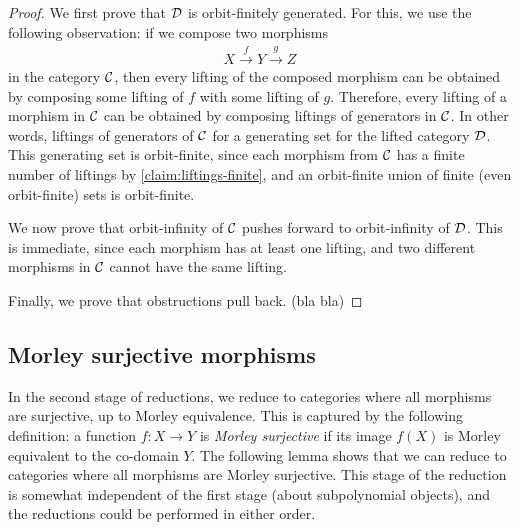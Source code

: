 \begin{proof}
We first prove that ${\mathcal D}$ is orbit-finitely generated. For this, we use the following observation: if we compose two morphisms 
\begin{align*}
X \stackrel{f} \to Y \stackrel{g} \to Z
\end{align*}
in the category ${\mathcal C}$, 
then every lifting of the composed morphism can be obtained by composing some lifting of $f$ with some lifting of $g$. Therefore, every lifting of a morphism in ${\mathcal C}$ can be obtained by composing liftings of generators in ${\mathcal C}$.  In other words, liftings of generators of ${\mathcal C}$ for a generating set for the lifted category ${\mathcal D}$. This generating set is orbit-finite, since each morphism from ${\mathcal C}$ has a finite number of liftings by  \cref{claim:liftings-finite}, and an  orbit-finite union of finite (even orbit-finite) sets is orbit-finite.

We now prove that orbit-infinity of ${\mathcal C}$ pushes forward to orbit-infinity of ${\mathcal D}$. This is immediate, since each morphism has at least one lifting, and two different morphisms in ${\mathcal C}$ cannot have the same lifting. 

Finally, we prove that obstructions pull back. (bla bla)
\end{proof}



\subsection{Morley surjective morphisms}
\label{sec:almost-surjective-morphisms}
In the second stage of reductions, we reduce to categories where all morphisms are surjective, up to Morley equivalence. This is captured by the following definition:  a function $f : X \to Y$ is \emph{Morley surjective} if its image $f(X)$ is Morley equivalent to the co-domain $Y$. The following lemma shows that we can reduce to categories where all morphisms are Morley surjective. This stage of the reduction is somewhat independent of the first stage (about subpolynomial objects), and the reductions could be performed in either order. 


